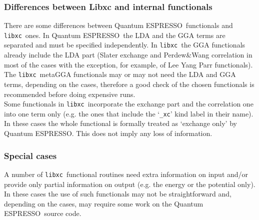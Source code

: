 \documentclass[12pt,a4paper]{article}
\def\qe{{\sc Quantum ESPRESSO}}
\def\libxc{\texttt{libxc}}
\begin{document}
\subsubsection{Differences between Libxc and internal functionals}
There are some differences between \qe\ functionals and \libxc\ ones. In \qe\ the LDA and the GGA terms are separated and must be specified independently. In \libxc\ the GGA functionals already include the LDA part (Slater exchange and Perdew\&Wang correlation in most of the cases with the exception, for example, of Lee Yang Parr functionals).\\
The \libxc\ metaGGA functionals may or may not need the LDA and GGA terms, depending on the cases, therefore a good check of the chosen functionals is recommended before doing expensive runs.\\
Some functionals in \libxc\ incorporate the exchange part and the correlation one into one term only (e.g. the ones that include the `\texttt{\_xc}' kind label in their name). In these cases the whole functional is formally treated as `exchange only' by \qe. This does not imply any loss of information.
%
\subsubsection{Special cases}
A number of \libxc\ functional routines need extra information on input and/or provide only partial information on output (e.g. the energy or the potential only). In these cases the use of such functionals may not be straightforward and, depending on the cases, may require some work on the \qe\ source code.
%
\end{document}

